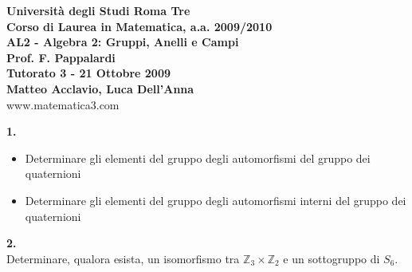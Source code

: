 \documentclass[italian,a4paper,11pt]
{article}
\newcommand{\Z}{\mathbb Z}
\begin{document}
\begin{center}

\textbf{Universit\`a degli Studi Roma Tre}\\

\textbf{Corso di Laurea in Matematica, a.a. 2009/2010}\\

\textbf{AL2 - Algebra 2: Gruppi, Anelli e Campi}\\

\textbf{Prof. F. Pappalardi}\\

\textbf{Tutorato 3 - 21 Ottobre 2009}\\

\textbf{Matteo Acclavio, Luca Dell'Anna}\\

www.matematica3.com\\
\end{center}



\vspace{0.4cm}


\noindent
\begin{Ex}\textbf{ 1.}
\begin{itemize}
\item Determinare gli elementi del gruppo degli automorfismi del gruppo dei quaternioni
\item Determinare gli elementi del gruppo degli automorfismi interni del gruppo dei quaternioni
\end{itemize}
\end{Ex}

\vspace{0.4 cm}
\noindent
\begin{Ex}\textbf{ 2.}\\
Determinare, qualora esista, un isomorfismo tra $\Z_{3} \times \Z_2 $ e un sottogruppo di $S_6$.
\end{Ex}
\end{document}
